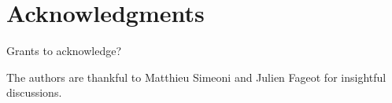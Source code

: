 \section*{Acknowledgments}

Grants to acknowledge? 

The authors are thankful to Matthieu Simeoni and Julien Fageot for insightful discussions.

